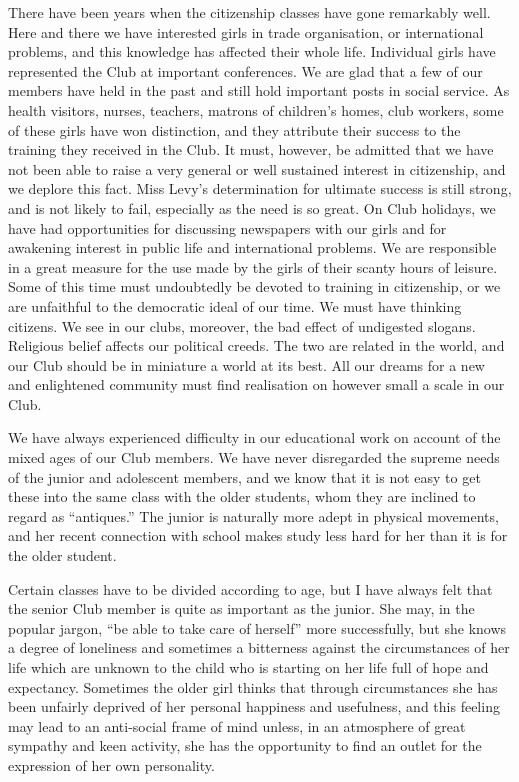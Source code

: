 There have been years when the citizenship classes
have gone remarkably well. Here and there we have
interested girls in trade organisation, or international
problems, and this knowledge has affected their whole
life. Individual girls have represented the Club at
important conferences. We are glad that a few of our members
have held in the past and still hold important posts in
social service. As health visitors, nurses, teachers, matrons
of children’s homes, club workers, some of these girls have
won distinction, and they attribute their success to the
training they received in the Club. It must, however, be
admitted that we have not been able to raise a very
general or well sustained interest in citizenship, and we
deplore this fact. Miss Levy’s determination for ultimate
success is still strong, and is not likely to fail, especially as
the need is so great. On Club holidays, we have had
opportunities for discussing newspapers with our girls and
for awakening interest in public life and international
problems. We are responsible in a great measure for the
use made by the girls of their scanty hours of leisure.
Some of this time must undoubtedly be devoted to training
in citizenship, or we are unfaithful to the democratic
ideal of our time. We must have thinking citizens. We
see in our clubs, moreover, the bad effect of undigested
slogans. Religious belief affects our political creeds. The
two are related in the world, and our Club should be in
miniature a world at its best. All our dreams for a new
and enlightened community must find realisation on however
small a scale in our Club.

We have always experienced difficulty in our educational
work on account of the mixed ages of our Club
members. We have never disregarded the supreme needs
of the junior and adolescent members, and we know that
it is not easy to get these into the same class with the older
students, whom they are inclined to regard as “antiques.”
The junior is naturally more adept in physical movements,
and her recent connection with school makes study
less hard for her than it is for the older student.

Certain classes have to be divided according to age, but
I have always felt that the senior Club member is quite
as important as the junior. She may, in the popular
jargon, “be able to take care of herself” more successfully,
but she knows a degree of loneliness and sometimes
a bitterness against the circumstances of her life which are
unknown to the child who is starting on her life full of
hope and expectancy. Sometimes the older girl thinks
that through circumstances she has been unfairly deprived
of her personal happiness and usefulness, and this feeling
may lead to an anti-social frame of mind unless, in an
atmosphere of great sympathy and keen activity, she has
the opportunity to find an outlet for the expression of
her own personality.

